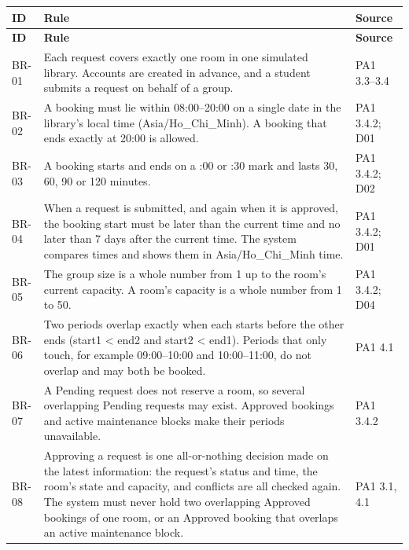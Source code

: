 \begingroup
\small
{}
\setlength{\tabcolsep}{3pt}
\renewcommand{\arraystretch}{1.12}
\begin{longtable}{|>{\raggedright\arraybackslash}p{}|>{\raggedright\arraybackslash}p{}|>{\raggedright\arraybackslash}p{}|}
\hline
\textbf{ID} & \textbf{Rule} & \textbf{Source} \\ \hline
\endfirsthead
\hline
\textbf{ID} & \textbf{Rule} & \textbf{Source} \\ \hline
\endhead
\hline
\endfoot
\hline
\endlastfoot
BR-01 & Each request covers exactly one room in one simulated library. Accounts are created in advance, and a student submits a request on behalf of a group. & PA1 3.3--3.4 \\ \hline
BR-02 & A booking must lie within 08:00--20:00 on a single date in the library's local time (Asia/Ho\_Chi\_Minh). A booking that ends exactly at 20:00 is allowed. & PA1 3.4.2; D01 \\ \hline
BR-03 & A booking starts and ends on a :00 or :30 mark and lasts 30, 60, 90 or 120 minutes. & PA1 3.4.2; D02 \\ \hline
BR-04 & When a request is submitted, and again when it is approved, the booking start must be later than the current time and no later than 7 days after the current time. The system compares times and shows them in Asia/Ho\_Chi\_Minh time. & PA1 3.4.2; D01 \\ \hline
BR-05 & The group size is a whole number from 1 up to the room's current capacity. A room's capacity is a whole number from 1 to 50. & PA1 3.4.2; D04 \\ \hline
BR-06 & Two periods overlap exactly when each starts before the other ends (start1 < end2 and start2 < end1). Periods that only touch, for example 09:00--10:00 and 10:00--11:00, do not overlap and may both be booked. & PA1 4.1 \\ \hline
BR-07 & A Pending request does not reserve a room, so several overlapping Pending requests may exist. Approved bookings and active maintenance blocks make their periods unavailable. & PA1 3.4.2 \\ \hline
BR-08 & Approving a request is one all-or-nothing decision made on the latest information: the request's status and time, the room's state and capacity, and conflicts are all checked again. The system must never hold two overlapping Approved bookings of one room, or an Approved booking that overlaps an active maintenance block. & PA1 3.1, 4.1 \\ \hline

\end{longtable}
